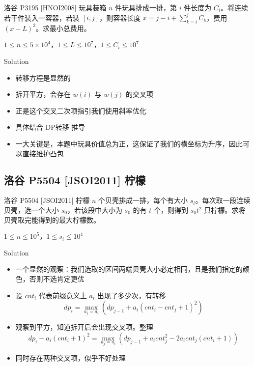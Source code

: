 ﻿\documentclass[aspectratio=169]{ctexbeamer}
\begin{document}
\begin{frame}{洛谷 P3195 [HNOI2008] 玩具装箱}
      $n$ 件玩具排成一排，第 $i$ 件长度为 $C_i$。将连续若干件装入一容器，若装 $[i,j]$，则容器长度 $x=j-i+\sum_{k=i}^j C_k$，费用 $(x-L)^2$。求最小总费用。
      
      $1\le n\le 5\times 10^4$，$1\le L\le 10^7$，$1\le C_i\le 10^7$
\end{frame}


\begin{frame}{Solution}
    \begin{itemize}
        \item 转移方程是显然的
        \item 拆开平方，会存在 $w(i)$ 与 $w(j)$ 的交叉项
        \item 正是这个交叉二次项指引我们使用斜率优化
        \item 具体结合 DP转移 推导
        \item 一大关键是，本题中玩具价值总为正，这保证了我们的横坐标为升序，因此可以直接维护凸包
    \end{itemize}
\end{frame}


\subsection{洛谷 P5504 [JSOI2011] 柠檬}

\begin{frame}{洛谷 P5504 [JSOI2011] 柠檬}
      $n$ 个贝壳排成一排，每个有大小 $s_i$。每次取一段连续贝壳，选一个大小 $s_0$，若该段中大小为 $s_0$ 的有 $t$ 个，则得到 $s_0t^2$ 只柠檬。求将贝壳取完能得到的最大柠檬数。
      
      $1\le n\le 10^5$，$1\le s_i\le 10^4$
\end{frame}

\begin{frame}{Solution}
    \begin{itemize}
        \item 一个显然的观察：我们选取的区间两端贝壳大小必定相同，且是我们指定的颜色，否则不选肯定更优
        \item 设 $cnt_i$ 代表前缀意义上 $a_i$ 出现了多少次，有转移
        $$
            dp_i=\max_{a_j=a_i}\left(dp_{j-1}+a_i(cnt_i-cnt_j+1)^2\right)
        $$
        \item 观察到平方，知道拆开后会出现交叉项。整理
        $$
            dp_i-a_i(cnt_i+1)^2=\max_{a_j=a_i}\left(dp_{j-1}+a_icnt_j^2-2a_icnt_j(cnt_i+1)\right)
        $$
        \item 同时存在两种交叉项，似乎不好处理
    \end{itemize}
\end{frame}
\end{document}
